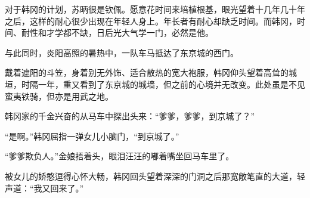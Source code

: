 对于韩冈的计划，苏昞很是钦佩。愿意花时间来培植根基，眼光望着十几年几十年之后，这样的耐心很少出现在年轻人身上。年长者有耐心却缺乏时间。而韩冈，时间、耐性和才学都不缺，日后光大气学一门，必然是他。

与此同时，炎阳高照的暑热中，一队车马抵达了东京城的西门。

戴着遮阳的斗笠，身着别无外饰、适合散热的宽大袍服，韩冈仰头望着高耸的城垣，时隔一年，重又看到了东京城的城墙，但之前的心境并无改变。此处虽是不见蛮夷铁骑，但亦是用武之地。

韩冈家的千金兴奋的从马车中探出头来：“爹爹，爹爹，到京城了？”

“是啊。”韩冈屈指一弹女儿小脑门，“到京城了。”

“爹爹欺负人。”金娘捂着头，眼泪汪汪的嘟着嘴坐回马车里了。

被女儿的娇憨逗得心怀大畅，韩冈回头望着深深的门洞之后那宽敞笔直的大道，轻声道：“我又回来了。” 

